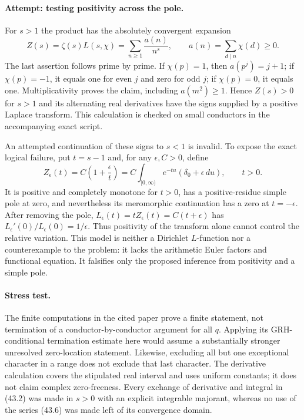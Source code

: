 \documentclass[11pt,a4paper]{article}
\numberwithin{equation}{section}
\begin{document}
\paragraph{Attempt: testing positivity across the pole.}
For $s>1$ the product has the absolutely convergent expansion
\[
 Z(s)=\zeta(s)L(s,\chi)=\sum_{n\ge1}\frac{a(n)}{n^s},
 \qquad a(n)=\sum_{d\mid n}\chi(d)\ge0. \tag{43.6}
\]
The last assertion follows prime by prime. If $\chi(p)=1$, then
$a(p^j)=j+1$; if $\chi(p)=-1$, it equals one for even $j$ and zero for
odd $j$; if $\chi(p)=0$, it equals one. Multiplicativity proves the
claim, including $a(m^2)\ge1$. Hence $Z(s)>0$ for $s>1$ and its
alternating real derivatives have the signs supplied by a positive
Laplace transform. This calculation is checked on small conductors in
the accompanying exact script.

An attempted continuation of these signs to $s<1$ is invalid. To expose
the exact logical failure, put $t=s-1$ and, for any $\epsilon,C>0$, define
\[
 Z_\epsilon(t)=C\left(1+\frac{\epsilon}{t}\right)
      =C\int_{[0,\infty)}e^{-tu}
                          (\delta_0+\epsilon\,du),\qquad t>0.
 \tag{43.7}
\]
It is positive and completely monotone for $t>0$, has a positive-residue
simple pole at zero, and nevertheless its meromorphic continuation has a
zero at $t=-\epsilon$. After removing the pole,
$L_\epsilon(t)=tZ_\epsilon(t)=C(t+\epsilon)$ has
$L_\epsilon'(0)/L_\epsilon(0)=1/\epsilon$. Thus positivity of the transform
alone cannot control the relative variation. This model is neither a
Dirichlet $L$-function nor a counterexample to the problem: it lacks the
arithmetic Euler factors and functional equation. It falsifies only the
proposed inference from positivity and a simple pole.

\paragraph{Stress test.}
The finite computations in the cited paper prove a finite statement, not
termination of a conductor-by-conductor argument for all $q$. Applying its
GRH-conditional termination estimate here would assume a substantially
stronger unresolved zero-location statement. Likewise, excluding all but
one exceptional character in a range does not exclude that last character.
The derivative calculation covers the stipulated real interval and uses
uniform constants; it does not claim complex zero-freeness. Every exchange
of derivative and integral in (43.2) was made in $s>0$ with an explicit
integrable majorant, whereas no use of the series (43.6) was made left of
its convergence domain.
\end{document}
